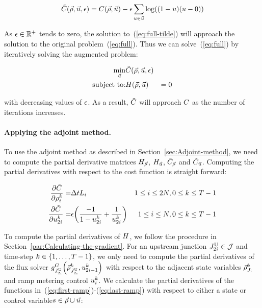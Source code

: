 \begin{equation}
\tilde{\cost}\left(\state,\control,\epsilon\right)=\cost\left(\state,\control\right)-\barrierTerm\sum_{\convar\in\control}\log\left(\left(1-\convar\right)\left(\convar-0\right)\right)\label{eq:full-tilde}
\end{equation}


As $\epsilon\in\mathbb{R}^{+}$ tends to zero, the solution to~(\ref{eq:full-tilde})
will approach the solution to the original problem~(\ref{eq:full}).
Thus we can solve~(\ref{eq:full}) by iteratively solving the augmented
problem:

\begin{eqnarray}
\min_{\control} & \tilde{\cost}\left(\state,\control,\epsilon\right)\label{eq:full-1}\\
\text{subject to:} & \sys\left(\state,\control\right) & =0\nonumber 
\end{eqnarray}


with decreasing values of $\epsilon$. As a result, $\tilde{C}$
will approach $C$ as the number of iterations increases.


\paragraph{Applying the adjoint method.}

To use the adjoint method as described in Section~\ref{sec:Adjoint-method},
we need to compute the partial derivative matrices $H_{\vec{\rho}}$, $H_{\vec{u}}$,
$\tilde{C}_{\vec{\rho}}$ and $\tilde{C}_{\vec{u}}$. Computing the partial
derivatives with respect to the cost function is straight forward:

\begin{eqnarray*}
\pfrac{\tilde{\cost}}{\discrete{\link}{\tind}}= & \Delta tL_{i} & 1\le i\le2\nlinks,0\le k\le T-1\\
\pfrac{\tilde{\cost}}{\ramp_{2\link}^{\tind}}= & \barrierTerm\left(\frac{-1}{1-\ramp_{2\link}^{\tind}}+\frac{1}{\ramp_{2\link}^{\tind}}\right) & 1\le i\le\nlinks,0\le k\le T-1
\end{eqnarray*}


To compute the partial derivatives of $H$, we follow the procedure
in Section~\ref{par:Calculating-the-gradient}. For an upstream junction
$J_{2i}^{\text{U}}\in\mathcal{J}$ and time-step $k\in\intrange 1{\ntime-1}$,
we only need to compute the partial derivatives of the flux solver
$\god_{\jup{2\link}}\left(\juncstate{\jup{2\link}}{\tind},\ramp_{2\link-1}^{\tind}\right)_{\text{}}$
with respect to the adjacent state variables $\vec{\rho}_{J_{i}}^{k}$
and ramp metering control $u_{i}^{k}$. We calculate the
partial derivatives of the functions in~(\ref{eq:first-ramp})-(\ref{eq:last-ramp})
with respect to either a state or control variable$s\in\vec{\rho}\cup\vec{u}$:

